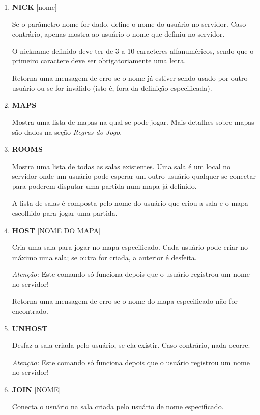 \documentclass{article}
\begin{document}
        \begin{enumerate}
        \item \textbf{NICK} [nome] \par
            Se o parâmetro nome for dado, define o nome do usuário no servidor. Caso contrário, apenas mostra ao usuário o nome que definiu no servidor. \par

            O nickname definido deve ter de 3 a 10 caracteres alfanuméricos, sendo que o primeiro caractere deve ser obrigatoriamente uma letra. \par

            Retorna uma mensagem de erro se o nome já estiver sendo usado por outro usuário ou se for inválido (isto é, fora da definição especificada).
        \item \textbf{MAPS} \par
            Mostra uma lista de mapas na qual se pode jogar. Mais detalhes sobre mapas são dados na seção \emph{Regras do Jogo}.
        \item \textbf{ROOMS} \par
            Mostra uma lista de todas as salas existentes. Uma sala é um local no servidor onde um usuário pode esperar um outro usuário qualquer se conectar para poderem disputar uma partida num mapa já definido. \par
            A lista de salas é composta pelo nome do usuário que criou a sala e o mapa escolhido para jogar uma partida.
        \item \textbf{HOST} [NOME DO MAPA] \par
            Cria uma sala para jogar no mapa especificado. Cada usuário pode criar no máximo uma sala; se outra for criada, a anterior é desfeita. \par
            \emph{Atenção:} Este comando só funciona depois que o usuário registrou um nome no servidor! \par
            Retorna uma mensagem de erro se o nome do mapa especificado não for encontrado.
        \item \textbf{UNHOST} \par
            Desfaz a sala criada pelo usuário, se ela existir. Caso contrário, nada ocorre. \par
            \emph{Atenção:} Este comando só funciona depois que o usuário registrou um nome no servidor!
        \item \textbf{JOIN} [NOME] \par
            Conecta o usuário na sala criada pelo usuário de nome especificado. \par

\end{enumerate}
\end{document}
